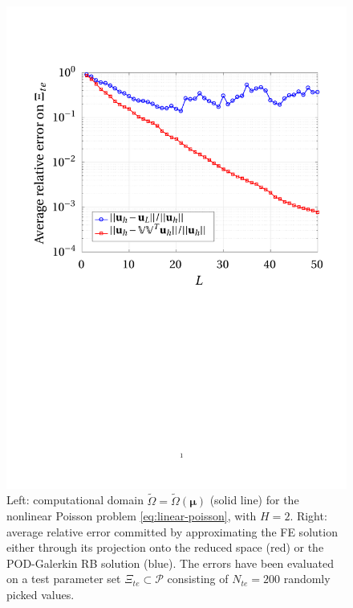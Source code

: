 \documentclass[12pt, a4paper, twoside, openright]{report}
\numberwithin{equation}{chapter}
\theoremstyle{theorem}
\theoremstyle{definition}
\theoremstyle{remark}
\theoremstyle{proposition}
\numberwithin{figure}{chapter}
\newcommand{\wt}[1]{\widetilde{#1}}
\newcommand{\bg}[1]{\boldsymbol{#1}}
\begin{document}
\begin{figure}[t]
\begin{minipage}{0.55\textwidth}
				\includegraphics[scale = 0.48, trim = {2.5cm 12cm 1cm 3.5cm}, clip]{poisson2d_4_error_vs_rank}
			\end{minipage}
			
			\caption{Left: computational domain $\wt{\Omega} = \wt{\Omega}(\bg{\mu})$ (solid line) for the nonlinear Poisson problem \eqref{eq:linear-poisson}, with $H = 2$. Right: average relative error committed by approximating the FE solution either through its projection onto the reduced space (red) or the POD-Galerkin RB solution (blue). The errors have been evaluated on a test parameter set $\Xi_{te} \subset \mathcal{P}$ consisting of $N_{te} = 200$ randomly picked values.}
			\label{fig:nonlinear-poisson}
		\end{figure}
				
\end{document}
